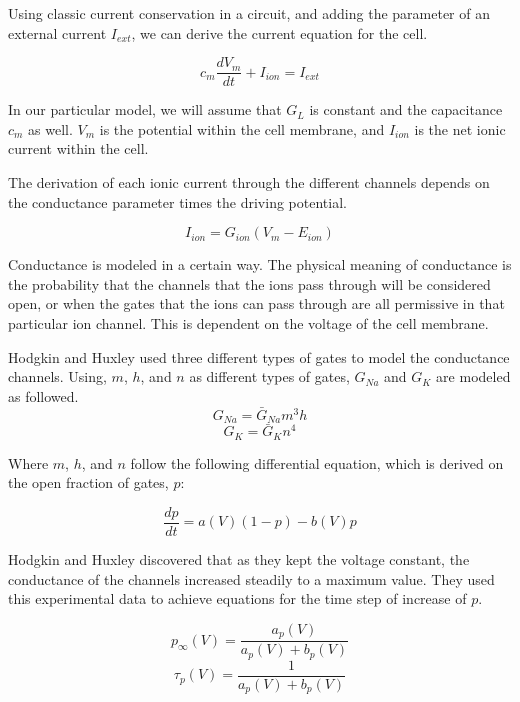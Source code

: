 \documentclass{article}
\begin{document}
Using classic current conservation in a circuit, and adding the parameter of an external current $I_{ext}$, we can derive the current equation for the cell.

\begin{equation}
    c_m\frac{dV_m}{dt} + I_{ion} = I_{ext}
\end{equation}

In our particular model, we will assume that $G_L$ is constant and the capacitance $c_m$ as well. $V_m$ is the potential within the cell membrane, and $I_{ion}$ is the net ionic current within the cell.

The derivation of each ionic current through the different channels depends on the conductance parameter times the driving potential.

\begin{equation}
    I_{ion} = G_{ion}(V_{m}-E_{ion})
\end{equation}

Conductance is modeled in a certain way. The physical meaning of conductance is the probability that the channels that the ions pass through will be considered open, or when the gates that the ions can pass through are all permissive in that particular ion channel. This is dependent on the voltage of the cell membrane. 

Hodgkin and Huxley used three different types of gates to model the conductance channels. Using, $m$, $h$, and $n$ as different types of gates, $G_{Na}$ and $G_K$ are modeled as followed.
\begin{equation}
    G_{Na} = \bar{G}_{Na}m^3h
\end{equation}
\begin{equation}
    G_{K} = \bar{G}_{K}n^4
\end{equation}

Where $m$, $h$, and $n$ follow the following differential equation, which is derived on the open fraction of gates, $p$:

\begin{equation}
    \frac{dp}{dt} = a(V)(1-p) - b(V)p
\end{equation}

Hodgkin and Huxley discovered that as they kept the voltage constant, the conductance of the channels increased steadily to a maximum value. They used this experimental data to achieve equations for the time step of increase of $p$.

\begin{equation}
    p_{\infty}(V) = \frac{a_p(V)}{a_p(V) + b_p(V)}
\end{equation}
\begin{equation}
    \tau_p(V) = \frac{1}{a_p(V) + b_p(V)}
    \label{eq:time}
\end{equation}
\end{document}
